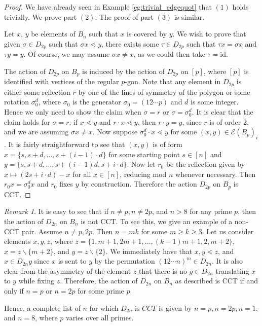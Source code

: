 \documentclass[smallextended, envcountsame, numbook]{svjour3}
\theoremstyle{plain}
\theoremstyle{definition}
\theoremstyle{remark}
\newtheorem{rmk}[thm]{Remark}
\numberwithin{equation}{section}
\newcommand{\id}{\mathrm{id}}
\begin{document}
\begin{proof}
We have already seen in Example \ref{eg:trivial_edgequot} that $(1)$ holds trivially. We prove part $(2)$. The proof of part $(3)$ is similar. 

Let $x$, $y$ be elements of $B_n$ such that $x$ is covered by $y$.  We wish to prove that given $\sigma \in D_{2p}$ such that $\sigma x \lessdot y$, there exists some $\tau \in D_{2p}$ such that $\tau x = \sigma x$ and $\tau y = y$. Of course, we may assume $\sigma x \neq x$, as we could then take $\tau = \id$.

The action of $D_{2p}$ on $B_p$ is induced by the action of $D_{2p}$ on $[p]$, where $[p]$ is identified with vertices of the regular $p$-gon. Note that any element in $D_{2p}$ is either some reflection $r$ by one of the lines of symmetry of the polygon or some rotation $\sigma_0^{d}$, where $\sigma_0$ is the generator $\sigma_0 = (12 \cdots p)$ and $d$ is some integer. Hence we only need to show the claim when $\sigma = r$ or $\sigma = \sigma_0^d$. It is clear that the claim holds for $\sigma = r$: if $x \lessdot y$ and $r \cdot x \lessdot y$, then $r \cdot y = y$, since $r$ is of order 2, and we are assuming $\sigma x \neq x$. Now suppose $\sigma_0^d \cdot x \lessdot y$ for some $(x,y) \in \mathcal E(B_p)_i$.  It is fairly straightforward to see that $(x, y)$ is of form $x = \{s, s+d, ..., s+(i-1)\cdot d\}$ for some starting point $s \in [n]$ and $y = \{s, s+d, ..., s+(i-1)d, s + i \cdot d\}$. Now let $r_0$ be the reflection given by $x \mapsto (2s+ i \cdot d)-x$ for all $x \in [n]$, reducing mod $n$ whenever necessary. Then $r_0 x = \sigma_0^d x$ and $r_0$ fixes $y$ by construction.  Therefore the action $D_{2p}$ on $B_p$ is CCT. 
\end{proof}


\begin{rmk}
\label{rem:iff_dihedral_cct}
It is easy to see that if $n \neq p,n \neq 2p$, and $n >8$ for any prime $p$, then the action of $D_{2n}$ on $B_n$ is not CCT. To see this, we give an example of a non-CCT pair. Assume $n \ne p, 2 p$.  Then $n = mk$ for some $m \ge k \ge 3$. Let us consider elements $x, y, z$, where $z = \{1, m+1, 2m+1, ..., (k-1)m+1, 2, m+2\}$, $x = z \backslash \{m+2\}$, and $y = z \backslash \{2\}$. We immediately have that $x, y \lessdot z$, and $x \in D_{2n} y$ since $x$ is sent to $y$ by the permutation $(12\cdots n)^m \in D_{2n}$. It is also clear from the asymmetry of the element $z$ that there is no $g \in D_{2n}$ translating $x$ to $y$ while fixing $z$. Therefore, the action of $D_{2n}$ on $B_n$ as described is CCT if and only if $n =p$ or $n = 2p$ for some prime $p$.

Hence, a complete list of $n$ for which $D_{2n}$ is $CCT$ is given by $n = p,n = 2p, n = 1$, and $n = 8$, where $p$ varies over all primes.
\end{rmk}
\end{document}
